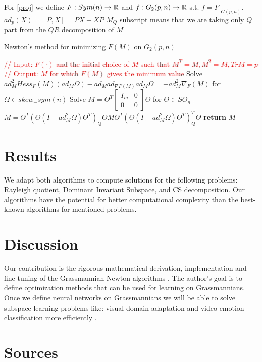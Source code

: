 \documentclass[a4paper]{article}
\begin{document}
For \ref{proj} we define $F: Sym(n) \to \mathbb{R} $ and  $f: G_2(p,n) \to \mathbb{R}$ s.t. $f= F|_{G(p,n)}. \quad$
$ ad_p(X) = [P, X] = PX -  XP $
$M_Q$ subscript means that we are taking only $Q$ part from the $QR$ decomposition of $M$
\begin{algorithm}
\caption{Newton's method for minimizing $F(M)$ on $G_2(p,n)$ }\label{alg:projAlg}
\begin{algorithmic}[1]
\State \textcolor{red}{// Input: $F(\cdot)$ and the initial choice of $M$ such that $M^T=M, M^2=M, TrM=p$}
\State \textcolor{red}{// Output: $M$ for which $F(M)$ gives the minimum value}
\State Solve
\State $ad^2_{M} Hess_{F}(M)(ad_{M}\Omega) - ad_{M} ad_{\nabla F (M) } ad_{M} \Omega = -ad^2_{M} \nabla_{F}(M)$
\State for $\Omega \in skew_-sym(n) $
\State
\State Solve 
\State $M = \Theta^T \begin{bmatrix} I_m & 0 \\ 0 & 0 \end{bmatrix} \Theta$ 
\State for $ \Theta \in SO_n$
\State
\State $ M = \Theta^T (\Theta( I - ad^2_{M} \Omega ) \Theta^T)_Q     \Theta M \Theta^T    (\Theta (I - ad^2_{M} \Omega) \Theta^T)_Q^T    \Theta$
\EndWhile
\State \textbf{return} $M$
\EndProcedure
\end{algorithmic}
\end{algorithm}
\section{Results}
We adapt both algorithms to compute solutions for the following problems: Rayleigh quotient, Dominant Invariant Subspace, and CS decomposition.
Our algorithms have the potential for better computational complexity than the best-known algorithms for mentioned problems.
\section{Discussion}
Our contribution is the rigorous mathematical derivation, implementation and fine-tuning of the Grassmannian Newton algorithms \cite{edelman_geometry_1998} \cite{helmke_newtons_2007}.
The author's goal is to define optimization methods that can be used for learning on Grassmannians.
Once we define neural networks on Grassmannians we will be able to solve subspace learning problems like:  visual domain adaptation and video emotion classification more efficiently \cite{huang_building_2018} \cite{zhang_grassmannian_2018} .
\newpage
\section{Sources}
\printbibliography[heading=none]
\end{document}
